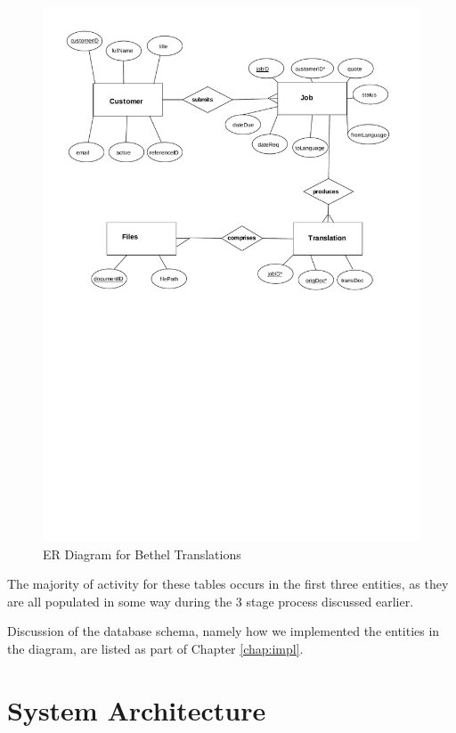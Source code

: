 \documentclass{l3proj}
\begin{document}
\begin{figure}
\begin{center}
\includegraphics[width=\linewidth, trim=0px 350px 0px 0px, clip=true]
	{figures/bt-erd}
\caption{ER Diagram for Bethel Translations}
\end{center}
\end{figure}

The majority of activity for these tables occurs in the first three entities, as
they are all populated 
in some way during the 3 stage process discussed earlier.

Discussion of the database schema, namely how we implemented the entities in the
diagram, are listed as part of Chapter \ref{chap:impl}.

\newpage
\section{System Architecture}
\end{document}
